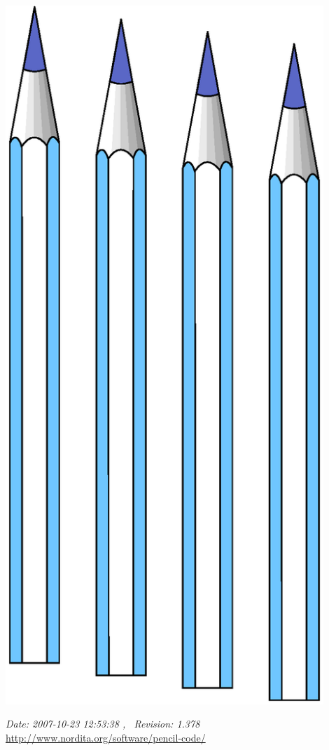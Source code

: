 \documentclass[\mydriver,12pt,twoside,notitlepage,a4paper]{article}
\begin{document}
\begin{titlepage}
\begin{center}
  \centerline{\includegraphics[angle=-90,width=0.9\textwidth]{pencils}}




  \emph{$ $Date: 2007-10-23 12:53:38 $ $,~ $ $Revision: 1.378 $ $}\\
  \url{http://www.nordita.org/software/pencil-code/}



\end{center}

\end{titlepage}
\end{document}
